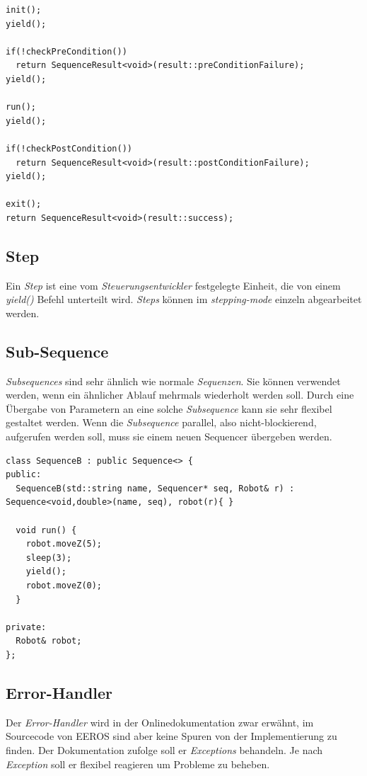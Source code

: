\begin{lstlisting}
init();
yield();

if(!checkPreCondition()) 
  return SequenceResult<void>(result::preConditionFailure);
yield();

run();
yield();

if(!checkPostCondition())
  return SequenceResult<void>(result::postConditionFailure);
yield();

exit();
return SequenceResult<void>(result::success);
\end{lstlisting}


\subsection{Step}
Ein \textit{Step} ist eine vom \textit{Steuerungsentwickler} festgelegte Einheit, die von einem \textit{yield()} Befehl unterteilt wird.
\textit{Steps} können im \textit{stepping-mode} einzeln abgearbeitet werden.


\subsection{Sub-Sequence}
\textit{Subsequences} sind sehr ähnlich wie normale \textit{Sequenzen}.
Sie können verwendet werden, wenn ein ähnlicher Ablauf mehrmals wiederholt werden soll.
Durch eine Übergabe von Parametern an eine solche \textit{Subsequence} kann sie sehr flexibel gestaltet werden.
Wenn die \textit{Subsequence} parallel, also nicht-blockierend, aufgerufen werden soll, muss sie einem neuen Sequencer übergeben werden.

\begin{lstlisting}
class SequenceB : public Sequence<> {
public:
  SequenceB(std::string name, Sequencer* seq, Robot& r) : Sequence<void,double>(name, seq), robot(r){ }
 
  void run() {
    robot.moveZ(5);
    sleep(3);
    yield();
    robot.moveZ(0);
  }
 
private: 
  Robot& robot;
};
\end{lstlisting}


\subsection{Error-Handler}
Der \textit{Error-Handler} wird in der Onlinedokumentation zwar erwähnt, im Sourcecode von EEROS sind aber keine Spuren von der Implementierung zu finden.
Der Dokumentation zufolge soll er \textit{Exceptions} behandeln.
Je nach \textit{Exception} soll er flexibel reagieren um Probleme zu beheben.



